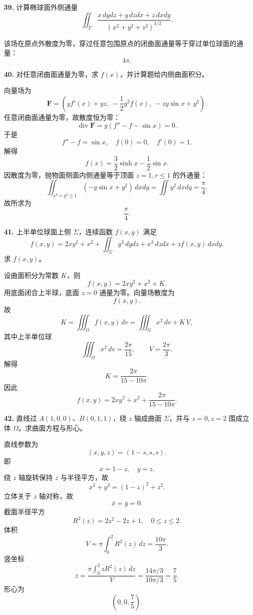 \begin{problemblock}
\textbf{39.} 计算椭球面外侧通量
\[
\iint_\Sigma\frac{x\,dydz+y\,dzdx+z\,dxdy}{(x^2+y^2+z^2)^{3/2}}.
\]
\end{problemblock}
\begin{solutionblock}
该场在原点外散度为零，穿过任意包围原点的闭曲面通量等于穿过单位球面的通量：
\[
\boxed{4\pi}.
\]
\end{solutionblock}

\begin{problemblock}
\textbf{40.} 对任意闭曲面通量为零，求 \(f(x)\)，并计算题给内侧曲面积分。
\end{problemblock}
\begin{solutionblock}
向量场为
\[
\boldsymbol F=\left(yf'(x)+yz,\ -\frac12y^2f(x),\ -zy\sin x+y^2\right).
\]
任意闭曲面通量为零，故散度恒为零：
\[
\operatorname{div}\boldsymbol F
=y(f''-f-\sin x)=0.
\]
于是
\[
f''-f=\sin x,\quad f(0)=0,\quad f'(0)=1.
\]
解得
\[
\boxed{f(x)=\frac32\sinh x-\frac12\sin x}.
\]
因散度为零，抛物面侧面内侧通量等于顶面 \(z=1,r\le1\) 的外通量：
\[
\iint_{x^2+y^2\le1}(-y\sin x+y^2)\,dxdy=\iint y^2\,dxdy=\frac{\pi}{4}.
\]
故所求为
\[
\boxed{\frac{\pi}{4}}.
\]
\end{solutionblock}

\begin{problemblock}
\textbf{41.} 上半单位球面上侧 \(\Sigma\)，连续函数 \(f(x,y)\) 满足
\[
f(x,y)=2xy^2+x^2+\iint_\Sigma y^3\,dydz+x^3\,dzdx+zf(x,y)\,dxdy.
\]
求 \(f(x,y)\)。
\end{problemblock}
\begin{solutionblock}
设曲面积分为常数 \(K\)，则
\[
f(x,y)=2xy^2+x^2+K.
\]
用底面闭合上半球，底面 \(z=0\) 通量为零。向量场散度为
\[
f(x,y).
\]
故
\[
K=\iiint_{\Omega}f(x,y)\,dv
=\iiint_\Omega x^2\,dv+K\,V,
\]
其中上半单位球
\[
\iiint_\Omega x^2\,dv=\frac{2\pi}{15},\qquad V=\frac{2\pi}{3}.
\]
解得
\[
K=\frac{2\pi}{15-10\pi}.
\]
因此
\[
\boxed{f(x,y)=2xy^2+x^2+\frac{2\pi}{15-10\pi}}.
\]
\end{solutionblock}

\begin{problemblock}
\textbf{42.} 直线过 \(A(1,0,0)\)、\(B(0,1,1)\)，绕 \(z\) 轴成曲面 \(\Sigma\)，并与 \(z=0,z=2\) 围成立体 \(\Omega\)。求曲面方程与形心。
\end{problemblock}
\begin{solutionblock}
直线参数为
\[
(x,y,z)=(1-s,s,s).
\]
即
\[
x=1-z,\quad y=z.
\]
绕 \(z\) 轴旋转保持 \(z\) 与半径平方，故
\[
\boxed{x^2+y^2=(1-z)^2+z^2}.
\]
立体关于 \(z\) 轴对称，故
\[
\bar x=\bar y=0.
\]
截面半径平方
\[
R^2(z)=2z^2-2z+1,\quad 0\le z\le2.
\]
体积
\[
V=\pi\int_0^2R^2(z)\,dz=\frac{10\pi}{3}.
\]
竖坐标
\[
\bar z=\frac{\pi\int_0^2zR^2(z)\,dz}{V}
=\frac{14\pi/3}{10\pi/3}
=\frac75.
\]
形心为
\[
\boxed{\left(0,0,\frac75\right)}.
\]
\end{solutionblock}

